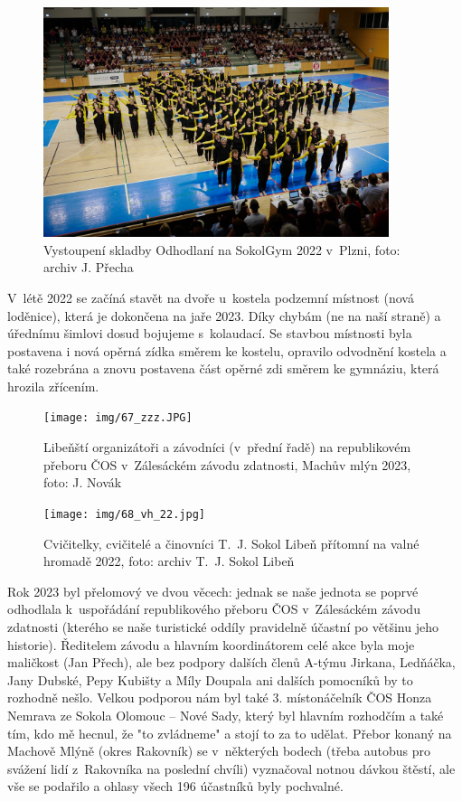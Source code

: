 \documentclass[a5paper, 11pt, twoside]{article}
\begin{document}
\begin{figure}[t]
  \centering 
  \includegraphics[width=0.9\textwidth]{img/66_odhodlani.jpg}
  \caption*{Vystoupení skladby Odhodlaní na SokolGym 2022 v~Plzni, foto:
  archiv J. Přecha}
\end{figure}

V~létě 2022 se začíná stavět na dvoře u~kostela podzemní místnost (nová
loděnice), která je dokončena na jaře 2023. Díky chybám (ne na naší
straně) a úřednímu šimlovi dosud bojujeme s~kolaudací. Se stavbou
místnosti byla postavena i nová opěrná zídka směrem ke kostelu, opravilo
odvodnění kostela a také rozebrána a znovu postavena část opěrné zdi
směrem ke gymnáziu, která hrozila zřícením.

\begin{figure}[hp]
  \centering 
  \texttt{[image: img/67\_zzz.JPG]}
  \caption*{Libeňští organizátoři a závodníci (v~přední řadě) na republikovém
  přeboru ČOS v~Zálesáckém závodu zdatnosti, Machův mlýn 2023, foto: J.
  Novák}
\end{figure}

\begin{figure}[hp]
  \centering 
  \texttt{[image: img/68\_vh\_22.jpg]}
  \caption*{Cvičitelky, cvičitelé a činovníci T.~J. Sokol Libeň přítomní na
  valné hromadě 2022, foto: archiv T.~J. Sokol Libeň}
\end{figure}


Rok 2023 byl přelomový ve dvou věcech: jednak se naše jednota se poprvé
odhodlala k~uspořádání republikového přeboru ČOS v~Zálesáckém závodu
zdatnosti (kterého se naše turistické oddíly pravidelně účastní po
většinu jeho historie). Ředitelem závodu a hlavním koordinátorem celé
akce byla moje maličkost (Jan Přech), ale bez podpory dalších členů
A-týmu Jirkana, Ledňáčka, Jany Dubské, Pepy Kubišty a Míly Doupala ani
dalších pomocníků by to rozhodně nešlo. Velkou podporou nám byl také 3.
místonáčelník ČOS Honza Nemrava ze Sokola Olomouc -- Nové Sady, který
byl hlavním rozhodčím a také tím, kdo mě hecnul, že "to zvládneme" a
stojí to za to udělat. Přebor konaný na Machově Mlýně (okres Rakovník)
se v~některých bodech (třeba autobus pro svážení lidí z~Rakovníka na
poslední chvíli) vyznačoval notnou dávkou štěstí, ale vše se podařilo a
ohlasy všech 196 účastníků byly pochvalné.
\end{document}

